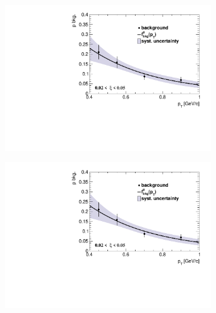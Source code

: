 \begin{figure}[h!]
	\centering
	\begin{subfigure}{.49\textwidth}
		\includegraphics[width=\textwidth,page=1]{chapters/chrgSTAR/img/DCAproton/p_bkg_summary.pdf}
	\end{subfigure}%
	\begin{subfigure}{.49\textwidth}
		\includegraphics[width=\textwidth,page=2]{chapters/chrgSTAR/img/DCAproton/p_bkg_summary.pdf}
	\end{subfigure}
	\begin{subfigure}{.49\textwidth}

\end{subfigure}
\end{figure}
